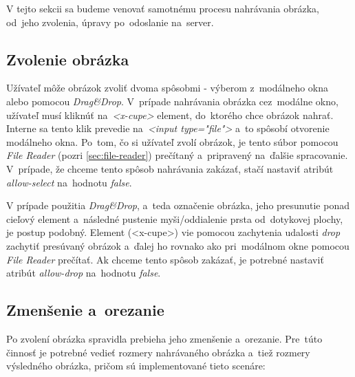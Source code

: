 V tejto sekcii sa budeme venovať samotnému procesu nahrávania obrázka, od~jeho zvolenia, úpravy po~odoslanie na~server.

\subsection{Zvolenie obrázka}

Užívateľ môže obrázok zvoliť dvoma spôsobmi - výberom z~modálneho okna alebo pomocou \emph{Drag\&Drop}. V~prípade nahrávania obrázka cez~modálne okno, užívateľ musí kliknúť na~\emph{<x-cupe>} element, do~ktorého chce obrázok nahrať. Interne sa tento klik prevedie na~\emph{<input type="file"\textgreater} a~to spôsobí otvorenie modálneho okna. Po~tom, čo si užívateľ zvolí obrázok, je tento súbor pomocou \emph{File Reader} (pozri \ref{sec:file-reader}) prečítaný a~pripravený na~ďalšie spracovanie. V~prípade, že chceme tento spôsob nahrávania zakázať, stačí nastaviť atribút \emph{allow-select} na~hodnotu \emph{false}.

V prípade použitia \emph{Drag\&Drop}, a~teda označenie obrázka, jeho presunutie ponad cieľový element a~následné pustenie myši/oddialenie prsta od~dotykovej plochy, je postup podobný. Element (<x-cupe>) vie pomocou zachytenia udalosti \emph{drop} zachytiť presúvaný obrázok a~ďalej ho rovnako ako pri~modálnom okne pomocou \emph{File Reader} prečítať. Ak chceme tento spôsob zakázať, je potrebné nastaviť atribút \emph{allow-drop} na~hodnotu \emph{false}.

\subsection{Zmenšenie a~orezanie}

Po zvolení obrázka spravidla prebieha jeho zmenšenie a~orezanie. Pre~túto činnosť je potrebné vedieť rozmery nahrávaného obrázka a~tiež rozmery výsledného obrázka, pričom sú implementované tieto scenáre:

